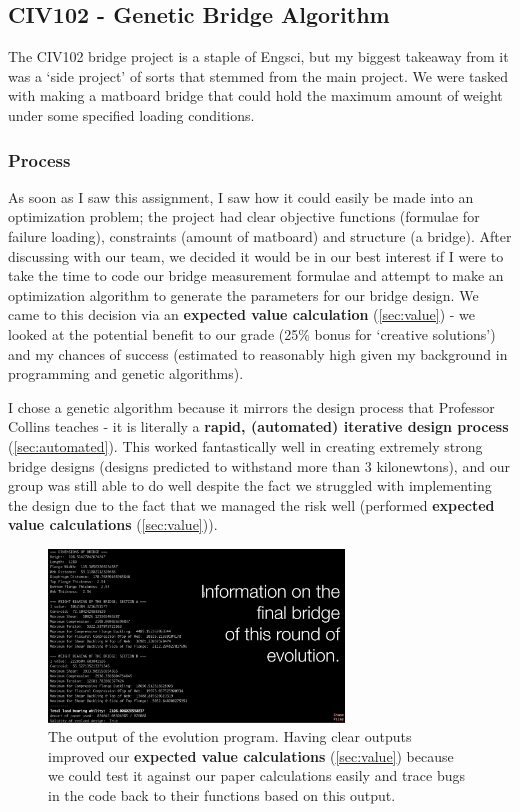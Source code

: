 \documentclass[a4paper,12pt]{article}
\begin{document}
\subsection{CIV102 - Genetic Bridge Algorithm}
\label{sec:bridge}
The CIV102 bridge project is a staple of Engsci, but my biggest takeaway from it was a ‘side project’ of sorts that stemmed from the main project. We were tasked with making a matboard bridge that could hold the maximum amount of weight under some specified loading conditions.

\subsubsection{Process}

As soon as I saw this assignment, I saw how it could easily be made into an optimization problem; the project had clear objective functions (formulae for failure loading), constraints (amount of matboard) and structure (a bridge). After discussing with our team, we decided it would be in our best interest if I were to take the time to code our bridge measurement formulae and attempt to make an optimization algorithm to generate the parameters for our bridge design. We came to this decision via an \textbf{expected value calculation} (\ref{sec:value}) - we looked at the potential benefit to our grade (25\% bonus for ‘creative solutions’) and my chances of success (estimated to reasonably high given my background in programming and genetic algorithms).

I chose a genetic algorithm because it mirrors the design process that Professor Collins teaches - it is literally a \textbf{rapid, (automated) iterative design process} (\ref{sec:automated}). This worked fantastically well in creating extremely strong bridge designs (designs predicted to withstand more than 3 kilonewtons), and our group was still able to do well despite the fact we struggled with implementing the design due to the fact that we managed the risk well (performed \textbf{expected value calculations} (\ref{sec:value})).

\begin{figure}[H]
\centering
\includegraphics[width=0.7\textwidth]{img/image005.png}
\caption{The output of the evolution program. Having clear outputs improved our \textbf{expected value calculations} (\ref{sec:value}) because we could test it against our paper calculations easily and trace bugs in the code back to their functions based on this output.}
\label{}
\end{figure}
\end{document}
